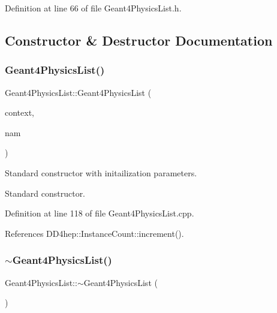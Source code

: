 Definition at line 66 of file Geant4\+Physics\+List.\+h.



\subsection{Constructor \& Destructor Documentation}
\hypertarget{class_d_d4hep_1_1_simulation_1_1_geant4_physics_list_a31c0d4c050c773be8cf95ac34a06eab7}{}\label{class_d_d4hep_1_1_simulation_1_1_geant4_physics_list_a31c0d4c050c773be8cf95ac34a06eab7} 
\subsubsection{\texorpdfstring{Geant4\+Physics\+List()}{Geant4PhysicsList()}}
{\footnotesize\ttfamily Geant4\+Physics\+List\+::\+Geant4\+Physics\+List (\begin{DoxyParamCaption}\item[{\hyperlink{class_d_d4hep_1_1_simulation_1_1_geant4_context}{Geant4\+Context} $\ast$}]{context,  }\item[{const std\+::string \&}]{nam }\end{DoxyParamCaption})}



Standard constructor with initailization parameters. 

Standard constructor. 

Definition at line 118 of file Geant4\+Physics\+List.\+cpp.



References D\+D4hep\+::\+Instance\+Count\+::increment().

\hypertarget{class_d_d4hep_1_1_simulation_1_1_geant4_physics_list_a224e107987da2017407996766e9bd445}{}\label{class_d_d4hep_1_1_simulation_1_1_geant4_physics_list_a224e107987da2017407996766e9bd445} 
\subsubsection{\texorpdfstring{$\sim$\+Geant4\+Physics\+List()}{~Geant4PhysicsList()}}
{\footnotesize\ttfamily Geant4\+Physics\+List\+::$\sim$\+Geant4\+Physics\+List (\begin{DoxyParamCaption}{ }\end{DoxyParamCaption})\hspace{0.3cm}{\ttfamily [virtual]}}



